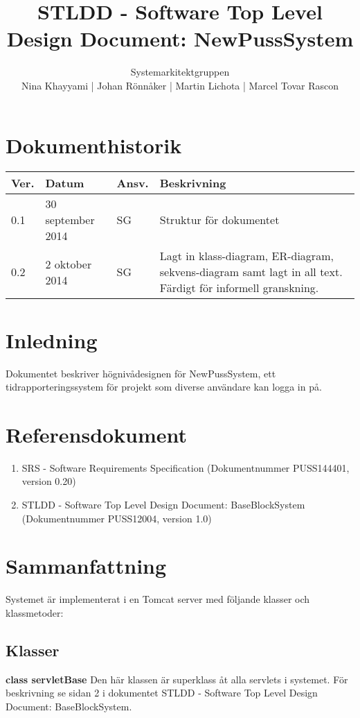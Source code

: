 \documentclass[a4paper]{article}
\title{STLDD - Software Top Level Design Document: NewPussSystem}
\author{Systemarkitektgruppen \\ Nina Khayyami | Johan Rönnåker | Martin Lichota | Marcel Tovar Rascon}
\date{}
\begin{document}
\maketitle
\thispagestyle{fancy}
\tableofcontents
\newpage

\section*{Dokumenthistorik}

\begin{tabular}{ l l l p{8.5cm} }
Ver. & Datum & Ansv. & Beskrivning \\\hline
0.1 & 30 september 2014 & SG & Struktur för dokumentet\\
0.2 & 2 oktober 2014 & SG & Lagt in klass-diagram, ER-diagram, sekvens-diagram samt lagt in all text. Färdigt för informell granskning.



\end{tabular}
\newpage
\section{Inledning}       
Dokumentet beskriver högnivådesignen för NewPussSystem, ett tidrapporteringssystem för projekt som diverse användare kan logga in på.



\section{Referensdokument}
\begin{enumerate}
\item SRS - Software Requirements Specification (Dokumentnummer PUSS144401, version 0.20)
\item STLDD - Software Top Level Design Document: BaseBlockSystem (Dokumentnummer PUSS12004, version 1.0)
\end{enumerate}



\section{Sammanfattning}
Systemet är implementerat i en Tomcat server med följande klasser och klassmetoder:

\subsection{Klasser}
\begin{hangparas}{1.5em}{1}
\textbf{class servletBase} Den här klassen är superklass åt alla servlets i systemet. För beskrivning se sidan 2 i dokumentet STLDD - Software Top Level Design Document: BaseBlockSystem.\end{hangparas} 
\end{document}
